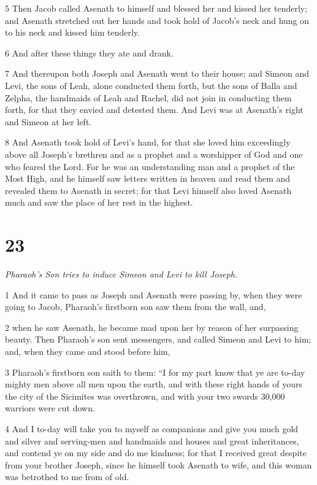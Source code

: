 \par 5 Then Jacob called Asenath to himself and blessed her and kissed her tenderly; and Asenath stretched out her hands and took hold of Jacob's neck and hung on to his neck and kissed him tenderly. 

\par 6 And after these things they ate and drank. 

\par 7 And thereupon both Joseph and Asenath went to their house; and Simeon and Levi, the sons of Leah, alone conducted them forth, but the sons of Balla and Zelpha, the handmaids of Leah and Rachel, did not join in conducting them forth, for that they envied and detested them. And Levi was at Asenath's right and Simeon at her left. 

\par 8 And Asenath took hold of Levi's hand, for that she loved him exceedingly above all Joseph's brethren and as a prophet and a worshipper of God and one who feared the Lord. For he was an understanding man and a prophet of the Most High, and he himself saw letters written in heaven and read them and revealed them to Asenath in secret; for that Levi himself also loved Asenath much and saw the place of her rest in the highest. 

\chapter{23}

\par \textit{Pharaoh's Son tries to induce Simeon and Levi to kill Joseph.}


\par 1 And it came to pass as Joseph and Asenath were passing by, when they were going to Jacob, Pharaoh's firstborn son saw them from the wall, and, 

\par 2 when he saw Asenath, he became mad upon her by reason of her surpassing beauty. Then Pharaoh's son sent messengers, and called Simeon and Levi to him; and, when they came and stood before him, 

\par 3 Pharaoh's firstborn son saith to them: “I for my part know that ye are to-day mighty men above all men upon the earth, and with these right hands of yours the city of the Sicimites was overthrown, and with your two swords 30,000 warriors were cut down. 

\par 4 And I to-day will take you to myself as companions and give you much gold and silver and serving-men and handmaids and houses and great inheritances, and contend ye on my side and do me kindness; for that I received great despite from your brother Joseph, since he himself took Asenath to wife, and this woman was betrothed to me from of old. 

